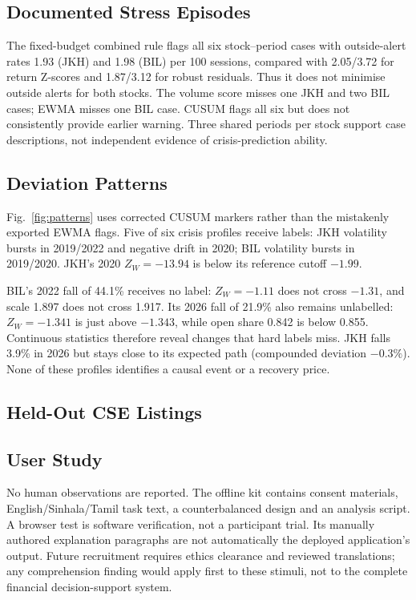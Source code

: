 \documentclass[conference]{IEEEtran}
\begin{document}
\subsection{Documented Stress Episodes}
The fixed-budget combined rule flags all six stock--period cases with outside-alert rates 1.93 (JKH) and 1.98 (BIL) per 100 sessions, compared with 2.05/3.72 for return Z-scores and 1.87/3.12 for robust residuals. Thus it does not minimise outside alerts for both stocks. The volume score misses one JKH and two BIL cases; EWMA misses one BIL case. CUSUM flags all six but does not consistently provide earlier warning. Three shared periods per stock support case descriptions, not independent evidence of crisis-prediction ability.



\subsection{Deviation Patterns}
Fig.~\ref{fig:patterns} uses corrected CUSUM markers rather than the mistakenly exported EWMA flags. Five of six crisis profiles receive labels: JKH volatility bursts in 2019/2022 and negative drift in 2020; BIL volatility bursts in 2019/2020. JKH's 2020 $Z_W=-13.94$ is below its reference cutoff $-1.99$.

BIL's 2022 fall of 44.1\% receives no label: $Z_W=-1.11$ does not cross $-1.31$, and scale 1.897 does not cross 1.917. Its 2026 fall of 21.9\% also remains unlabelled: $Z_W=-1.341$ is just above $-1.343$, while open share 0.842 is below 0.855. Continuous statistics therefore reveal changes that hard labels miss. JKH falls 3.9\% in 2026 but stays close to its expected path (compounded deviation $-0.3\%$). None of these profiles identifies a causal event or a recovery price.





\subsection{Held-Out CSE Listings}
\ReplicationResults



\subsection{User Study}
No human observations are reported. The offline kit contains consent materials, English/Sinhala/Tamil task text, a counterbalanced design and an analysis script. A browser test is software verification, not a participant trial. Its manually authored explanation paragraphs are not automatically the deployed application's output. Future recruitment requires ethics clearance and reviewed translations; any comprehension finding would apply first to these stimuli, not to the complete financial decision-support system.
\end{document}
